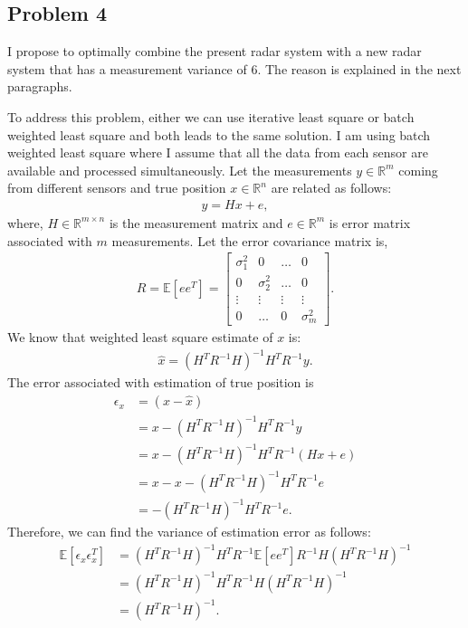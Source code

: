 \subsection*{Problem 4}
I propose to optimally combine the present radar system with a
new radar system that has a measurement variance of $6$. The reason is explained in the next paragraphs.


To address this problem, either we can use iterative least square or batch weighted least square and both leads to the same solution. I am using batch weighted least square where I assume that all the data from each sensor are available and processed simultaneously. Let the measurements $y \in \mathbb{R}^m$ coming from different sensors and true position $x \in \mathbb{R}^n$ are related as follows:
\begin{align*}
	y = Hx + e,
\end{align*}
where, $H \in \mathbb{R}^{m \times n}$ is the measurement matrix and $e \in \mathbb{R}^m$ is error matrix associated with $m$ measurements. Let the error covariance matrix is,
\begin{align*}
	R = \mathbb{E}[ee^T] = \begin{bmatrix}\sigma_1^2 & 0 & \ldots & 0\\ 0 & \sigma_2^2 & \ldots & 0\\ \vdots & \vdots & \vdots & \vdots\\0 & \ldots & 0 & \sigma_m^2 \end{bmatrix}.
\end{align*}
We know that weighted least square estimate of $x$ is:
\begin{align*}
	\hat{x} = (H^TR^{-1}H)^{-1}H^TR^{-1}y.
\end{align*}
The error associated with estimation of true position is
\begin{align*}
	\epsilon_x &= (x-\hat{x})\\
	&= x-(H^TR^{-1}H)^{-1}H^TR^{-1}y\\
	&= x-(H^TR^{-1}H)^{-1}H^TR^{-1}(Hx+e)\\
	&= x-x-(H^TR^{-1}H)^{-1}H^TR^{-1}e\\
	&= -(H^TR^{-1}H)^{-1}H^TR^{-1}e.
\end{align*}
Therefore, we can find the variance of estimation error as follows:
\begin{align}\label{eq:q4_exp_error}
	\mathbb{E}[\epsilon_x \epsilon_x^T] &= (H^TR^{-1}H)^{-1}H^TR^{-1}\mathbb{E}[ee^T]R^{-1}H(H^TR^{-1}H)^{-1}\\
	&= (H^TR^{-1}H)^{-1}H^TR^{-1}H(H^TR^{-1}H)^{-1}\\
	&= (H^TR^{-1}H)^{-1}.
\end{align}
